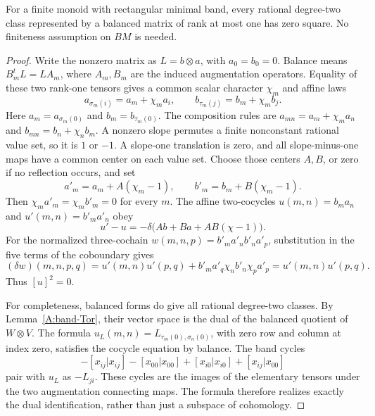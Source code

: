 \begin{lemma}
\label{A:rank-one-square}
For a finite monoid with rectangular minimal band, every rational
degree-two class represented by a balanced matrix of rank at most
one has zero square. No finiteness assumption on $BM$ is needed.
\end{lemma}
\begin{proof}
Write the nonzero matrix as $L=b\otimes a$, with $a_0=b_0=0$.
Balance means $B_m^tL=LA_m$, where $A_m,B_m$ are the induced
augmentation operators. Equality of these two rank-one tensors
gives a common scalar character $\chi_m$ and affine laws
\[
 a_{\sigma_m(i)}=a_m+\chi_m a_i,\qquad
 b_{\tau_m(j)}=b_m+\chi_m b_j.
\]
Here $a_m=a_{\sigma_m(0)}$ and $b_m=b_{\tau_m(0)}$.
The composition rules are
$a_{mn}=a_m+\chi_m a_n$ and
$b_{mn}=b_n+\chi_n b_m$.
A nonzero slope permutes a finite nonconstant rational value set,
so it is $1$ or $-1$. A slope-one translation is zero, and all
slope-minus-one maps have a common center on each value set.
Choose those centers $A,B$, or zero if no reflection occurs, and set
\[
 a'_m=a_m+A(\chi_m-1),\qquad
 b'_m=b_m+B(\chi_m-1).
\]
Then $\chi_m a'_m=\chi_m b'_m=0$ for every $m$.
The affine two-cocycles $u(m,n)=b_m a_n$ and
$u'(m,n)=b'_m a'_n$ obey
\[
 u'-u=-\delta\bigl(Ab+Ba+AB(\chi-1)\bigr).
\]
For the normalized three-cochain
$w(m,n,p)=b'_m a'_n b'_n a'_p$, substitution in the five terms
of the coboundary gives
\[
 (\delta w)(m,n,p,q)
 =u'(m,n)u'(p,q)
   +b'_m a'_q\chi_n b'_n\chi_p a'_p
 =u'(m,n)u'(p,q).
\]
Thus $[u]^2=0$.

For completeness, balanced forms do give all rational degree-two
classes. By Lemma~\ref{A:band-Tor}, their vector space is the
dual of the balanced quotient of $W\otimes V$. The formula
$u_L(m,n)=L_{\tau_m(0),\sigma_n(0)}$, with zero row and
column at index zero, satisfies the cocycle equation by balance.
The band cycles
\[
 -[x_{ij}|x_{ij}]-[x_{00}|x_{00}]
 +[x_{i0}|x_{i0}]+[x_{ij}|x_{00}]
\]
pair with $u_L$ as $-L_{ji}$. These cycles are the images of
the elementary tensors under the two augmentation connecting
maps. The formula therefore realizes exactly the dual
identification, rather than just a subspace of cohomology.
\end{proof}

